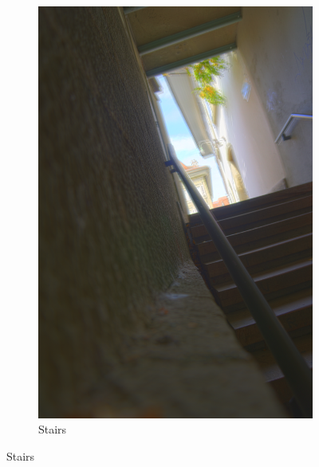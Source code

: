 \documentclass[a4spaper]{article}
\begin{document}
\begin{figure}[ht]
\begin{subfigure}[h]{0.48\textwidth}
		\includegraphics[width=\textwidth]{tonemap/stairs_tonemapped_2_0-12_40}
		\caption*{Stairs}
	\end{subfigure}	
	

\end{figure}
\end{document}
